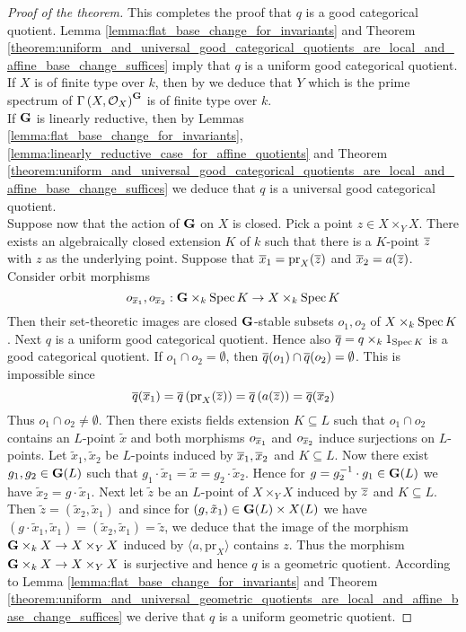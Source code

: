 \begin{proof}[Proof of the theorem]
This completes the proof that $q$ is a good categorical quotient. Lemma \ref{lemma:flat_base_change_for_invariants} and Theorem \ref{theorem:uniform_and_universal_good_categorical_quotients_are_local_and_affine_base_change_suffices} imply that $q$ is a uniform good categorical quotient.\\
If $X$ is of finite type over $k$, then by {\cite[Theorem 3.1]{Geometrically_reductive_and_Nagata}} we deduce that $Y$ which is the prime spectrum of $\Gamma\left(X,{\mathcal O}_X\right)^{\mathbf{G}}$ is of finite type over $k$.\\
If $\mathbf{G}$ is linearly reductive, then by Lemmas \ref{lemma:flat_base_change_for_invariants}, \ref{lemma:linearly_reductive_case_for_affine_quotients} and Theorem \ref{theorem:uniform_and_universal_good_categorical_quotients_are_local_and_affine_base_change_suffices} we deduce that $q$ is a universal good categorical quotient.\\
Suppose now that the action of $\mathbf{G}$ on $X$ is closed. Pick a point $z\in X\times_YX$. There exists an algebraically closed extension $K$ of $k$ such that there is a $K$-point $\overline{z}$ with $z$ as the underlying point. Suppose that $\overline{x}_1 = \mathrm{pr}_X(\overline{z})$ and $\overline{x}_2 = a(\overline{z})$. Consider orbit morphisms 
$$o_{\overline{x}_1},o_{\overline{x}_2}:\mathbf{G}\times_k\mathrm{Spec}\, K\rightarrow X\times_k\mathrm{Spec}\, K$$
Then their set-theoretic images are closed $\mathbf{G}$-stable subsets $o_1,o_2$ of $X\times_k\mathrm{Spec}\, K$. Next $q$ is a uniform good categorical quotient. Hence also $\overline{q} = q\times_k1_{\mathrm{Spec}\, K}$ is a good categorical quotient. If $o_1\cap o_2 = \emptyset$, then $\overline{q}(o_1)\cap \overline{q}(o_2) = \emptyset$. This is impossible since 
$$\overline{q}(\overline{x}_1) = \overline{q}\left(\mathrm{pr}_X(\overline{z})\right) = \overline{q}\left(a(\overline{z})\right)= \overline{q}(\overline{x}_2)$$
Thus $o_1\cap o_2 \neq \emptyset$. Then there exists fields extension $K\subseteq L$ such that $o_1\cap o_2$ contains an $L$-point $\tilde{x}$ and both morphisms $o_{\overline{x}_1}$ and $o_{\overline{x}_2}$ induce surjections on $L$-points. Let $\tilde{x}_1,\tilde{x}_2$ be $L$-points induced by $\overline{x}_1,\overline{x}_2$ and $K\subseteq L$. Now there exist $g_1,g_2\in \mathbf{G}(L)$ such that $g_1\cdot \tilde{x}_1 = \tilde{x} = g_2\cdot \tilde{x}_2$. Hence for $g = g_2^{-1}\cdot g_1\in \mathbf{G}(L)$ we have $\tilde{x}_2 = g\cdot \tilde{x}_1$. Next let $\tilde{z}$ be an $L$-point of $X\times_YX$ induced by $\overline{z}$ and $K\subseteq L$. Then $\tilde{z} = (\tilde{x}_2,\tilde{x}_1)$ and since for $(g,\tilde{x}_1) \in \mathbf{G}(L)\times X(L)$ we have $(g\cdot \tilde{x}_1, \tilde{x}_1) = (\tilde{x}_2,\tilde{x}_1) = \tilde{z}$, we deduce that the image of the morphism $\mathbf{G}\times_kX\rightarrow X\times_YX$ induced by $\langle a, \mathrm{pr}_X\rangle$ contains $z$. Thus the morphism $\mathbf{G}\times_kX\rightarrow X\times_YX$ is surjective and hence $q$ is a geometric quotient. According to Lemma \ref{lemma:flat_base_change_for_invariants} and Theorem \ref{theorem:uniform_and_universal_geometric_quotients_are_local_and_affine_base_change_suffices} we derive that $q$ is a uniform geometric quotient.
\end{proof}

